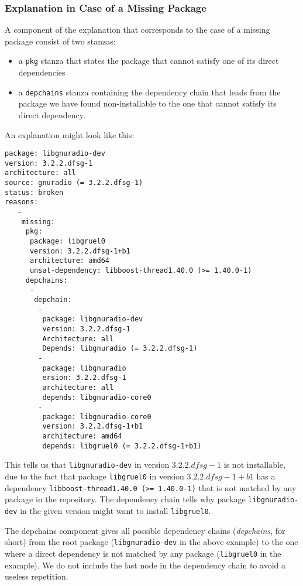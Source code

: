 \subsubsection{Explanation in Case of a Missing Package}
A component of the explanation that corresponds to the case of a
missing package consist of two stanzas:
\begin{itemize}
\item a \texttt{pkg} stanza that states the package that cannot satisfy
  one of its direct dependencies
\item a \texttt{depchains} stanza containing the dependency chain that
  leads from the package we have found non-installable to the one that
  cannot satisfy its direct dependency.
\end{itemize}
\begin{example}
An explanation might look like this:
\begin{verbatim}
package: libgnuradio-dev
version: 3.2.2.dfsg-1
architecture: all
source: gnuradio (= 3.2.2.dfsg-1)
status: broken
reasons:
   -
    missing:
     pkg:
      package: libgruel0
      version: 3.2.2.dfsg-1+b1
      architecture: amd64
      unsat-dependency: libboost-thread1.40.0 (>= 1.40.0-1)
     depchains:
      -
       depchain:
        -
         package: libgnuradio-dev
         version: 3.2.2.dfsg-1
         Architecture: all
         Depends: libgnuradio (= 3.2.2.dfsg-1)
        -
         package: libgnuradio
         ersion: 3.2.2.dfsg-1
         architecture: all
         depends: libgnuradio-core0
        -
         package: libgnuradio-core0
         version: 3.2.2.dfsg-1+b1
         architecture: amd64
         depends: libgruel0 (= 3.2.2.dfsg-1+b1)
\end{verbatim}
This tells us that \texttt{libgnuradio-dev} in version $3.2.2.dfsg-1$
is not installable, due to the fact that package \texttt{libgruel0}
in version $3.2.2.dfsg-1+b1$ has a dependency
\texttt{libboost-thread1.40.0 (>= 1.40.0-1)} that is not matched by
any package in the repository. The dependency chain tells why package
\texttt{libgnuradio-dev} in the given version might want to install
\texttt{libgruel0}.
\end{example}

The depchains component gives all possible dependency chains (\textit{depchains}, for short) from the root package
(\texttt{libgnuradio-dev} in the above example) to the one where a
direct dependency is not matched by any package (\texttt{libgruel0} in
the example). We do not include the last node in the dependency chain
to avoid a useless repetition.


